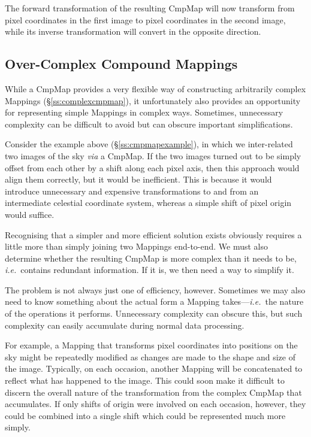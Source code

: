 \documentclass[twoside,11pt]{article}
\newcommand{\secref}[1]{\S\ref{#1}}
\newcommand{\secref}[1]{\ref{#1}}
\begin{document}
The forward transformation of the resulting CmpMap will now transform
from pixel coordinates in the first image to pixel coordinates in the
second image, while its inverse transformation will convert in the
opposite direction.

\subsection{\label{ss:overcomplexcmpmaps}Over-Complex Compound Mappings}

While a CmpMap provides a very flexible way of constructing
arbitrarily complex Mappings (\secref{ss:complexcmpmap}), it
unfortunately also provides an opportunity for representing simple
Mappings in complex ways. Sometimes, unnecessary complexity can be
difficult to avoid but can obscure important simplifications.

Consider the example above (\secref{ss:cmpmapexample}), in which we
inter-related two images of the sky {\em{via}} a CmpMap.  If the two
images turned out to be simply offset from each other by a shift along
each pixel axis, then this approach would align them correctly, but it
would be inefficient. This is because it would introduce unnecessary
and expensive transformations to and from an intermediate celestial
coordinate system, whereas a simple shift of pixel origin would
suffice.

Recognising that a simpler and more efficient solution exists
obviously requires a little more than simply joining two Mappings
end-to-end. We must also determine whether the resulting CmpMap is
more complex than it needs to be, {\em{i.e.}}\ contains redundant
information. If it is, we then need a way to simplify it.

The problem is not always just one of efficiency, however. Sometimes
we may also need to know something about the actual form a Mapping
takes---{\em{i.e.}}\ the nature of the operations it performs.
Unnecessary complexity can obscure this, but such complexity can
easily accumulate during normal data processing.

For example, a Mapping that transforms pixel coordinates into
positions on the sky might be repeatedly modified as changes are made
to the shape and size of the image. Typically, on each occasion,
another Mapping will be concatenated to reflect what has happened to
the image. This could soon make it difficult to discern the overall
nature of the transformation from the complex CmpMap that
accumulates. If only shifts of origin were involved on each occasion,
however, they could be combined into a single shift which could be
represented much more simply.
\end{document}
